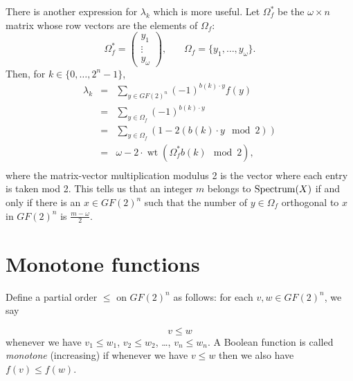 \documentclass[12pt]{article}
\newtheorem{remark}{Remark}
\newcommand{\wt}{\mathop{wt}}
\begin{document}
There is another expression for $\lambda_k$ which is more useful.
Let $\Omega_f^*$ be the $\omega\times n$ matrix whose row vectors
are the elements of $\Omega_f$:
\[
\Omega_f^* =
\left(
\begin{array}{c}
y_1\\
\vdots \\
y_\omega
\end{array}
\right),
\ \ \ \ \ \ \ \
\Omega_f = \{y_1,\dots, y_\omega\}.
\]
Then, for ${k \in \{0,\ldots,2^n-1\}}$,
\begin{eqnarray*}
\lambda_k & =& \sum_{y\in GF(2)^n}  (-1)^{b(k)\cdot y}f(y)\\
 & =&  \sum_{y\in \Omega_f}  (-1)^{b(k)\cdot y}\\
 & =&  \sum_{y\in \Omega_f}  (1 - 2 (b(k)\cdot y\mod 2))\\
 & = & \omega - 2\cdot \wt(\Omega_f^* b(k) \mod 2),\\
\end{eqnarray*}
where the matrix-vector multiplication modulus 2 is the vector where
each entry is taken mod 2.
This tells us that an integer $m$ belongs to
$ {\rm Spectrum}(X)$ if and only if there is
an $x\in GF(2)^n$ such that
the number of $y\in \Omega_f$ orthogonal to $x$ in $GF(2)^n$ is
$\frac{m-\omega}{2}$.




\section{Monotone functions}

Define a partial order $\leq $ on $GF(2)^n$ as follows:
for each $v,w\in GF(2)^n$, we say

\[
v\leq w
\]
whenever we have
$v_1 \leq w_1$, $v_2 \leq w_2$, \dots, $v_n \leq w_n$.
A Boolean function is called {\it monotone} (increasing) if whenever
we have $v\leq w$ then we also have $f(v) \leq f(w)$.
\end{document}
